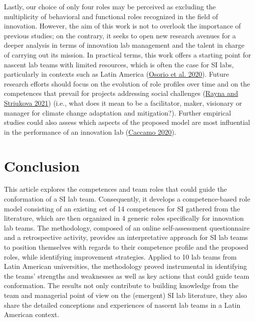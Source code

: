 \documentclass[AMA,STIX1COL,APA,STIX2COL]{WileyNJD-v2}
\begin{document}
Lastly, our choice of only four roles may be perceived as excluding the
multiplicity of behavioral and functional roles recognized in the field
of innovation. However, the aim of this work is not to overlook the
importance of previous studies; on the contrary, it seeks to open new
research avenues for a deeper analysis in terms of innovation lab
management and the talent in charge of carrying out its mission. In
practical terms, this work offers a starting point for nascent lab teams
with limited resources, which is often the case for SI labs,
particularly in contexts such as Latin America
(\protect\hyperlink{ref-Osorio2020}{Osorio et al. 2020}). Future
research efforts should focus on the evolution of role profiles over
time and on the competences that prevail for projects addressing social
challenges (\protect\hyperlink{ref-Rayna2021}{Rayna and Striukova 2021})
(i.e., what does it mean to be a facilitator, maker, visionary or
manager for climate change adaptation and mitigation?). Further
empirical studies could also assess which aspects of the proposed model
are most influential in the performance of an innovation lab
(\protect\hyperlink{ref-Caccamo2020}{Caccamo 2020}).

\hypertarget{conclusion}{%
\section{Conclusion}\label{conclusion}}

This article explores the competences and team roles that could guide
the conformation of a SI lab team. Consequently, it develops a
competence-based role model consisting of an existing set of 14
competences for SI gathered from the literature, which are then
organized in 4 generic roles specifically for innovation lab teams. The
methodology, composed of an online self-assessment questionnaire and a
retrospective activity, provides an interpretative approach for SI lab
teams to position themselves with regards to their competence profile
and the proposed roles, while identifying improvement strategies.
Applied to 10 lab teams from Latin American universities, the
methodology proved instrumental in identifying the teams' strengths and
weaknesses as well as key actions that could guide team conformation.
The results not only contribute to building knowledge from the team and
managerial point of view on the (emergent) SI lab literature, they also
share the detailed conceptions and experiences of nascent lab teams in a
Latin American context.
\end{document}
